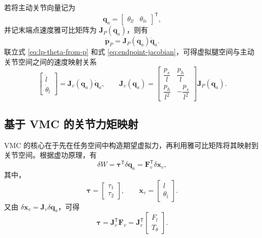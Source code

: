 若将主动关节向量记为
\begin{equation}
  \boldsymbol{q}_a =
  \begin{bmatrix}
    \theta_{ll} & \theta_{lr}
  \end{bmatrix}^{\mathsf{T}},
  \label{eq:active-joint-vector-ch3}
\end{equation}
并记末端点速度雅可比矩阵为 $\boldsymbol{J}_P(\boldsymbol{q}_a)$，则有
\begin{equation}
  \dot{\boldsymbol{p}}_P = \boldsymbol{J}_P(\boldsymbol{q}_a)\dot{\boldsymbol{q}}_a.
  \label{eq:endpoint-jacobian}
\end{equation}
联立式 \eqref{eq:lp-theta-from-p} 和式 \eqref{eq:endpoint-jacobian}，可得虚拟腿空间与主动关节空间之间的速度映射关系
\begin{equation}
  \begin{bmatrix}
    \dot{l} \\
    \dot{\theta}_l
  \end{bmatrix}
  =
  \boldsymbol{J}_v(\boldsymbol{q}_a)\dot{\boldsymbol{q}}_a,
  \qquad
  \boldsymbol{J}_v(\boldsymbol{q}_a) =
  \begin{bmatrix}
    \dfrac{p_s}{l} & \dfrac{p_h}{l} \\
    \dfrac{p_h}{l^2} & -\dfrac{p_s}{l^2}
  \end{bmatrix}
  \boldsymbol{J}_P(\boldsymbol{q}_a).
  \label{eq:virtual-jacobian}
\end{equation}

\subsection{基于 VMC 的关节力矩映射}

VMC 的核心在于先在任务空间中构造期望虚拟力，再利用雅可比矩阵将其映射到关节空间。根据虚功原理，有
\begin{equation}
  \delta W = \boldsymbol{\tau}^\mathsf{T}\delta\boldsymbol{q}_a
  =
  \boldsymbol{F}_v^\mathsf{T}\delta\boldsymbol{x}_v,
  \label{eq:virtual-work}
\end{equation}
其中，
\begin{equation}
  \boldsymbol{\tau} =
  \begin{bmatrix}
    \tau_1 \\
    \tau_2
  \end{bmatrix},
  \qquad
  \boldsymbol{x}_v =
  \begin{bmatrix}
    l \\
    \theta_l
  \end{bmatrix}.
  \label{eq:joint-torque-and-state}
\end{equation}
又由 $\delta\boldsymbol{x}_v = \boldsymbol{J}_v \delta\boldsymbol{q}_a$，可得
\begin{equation}
  \boldsymbol{\tau} = \boldsymbol{J}_v^\mathsf{T}\boldsymbol{F}_v
  =
  \boldsymbol{J}_v^\mathsf{T}
  \begin{bmatrix}
    F_l \\
    T_\theta
  \end{bmatrix}.
  \label{eq:vmc-torque-map}
\end{equation}

